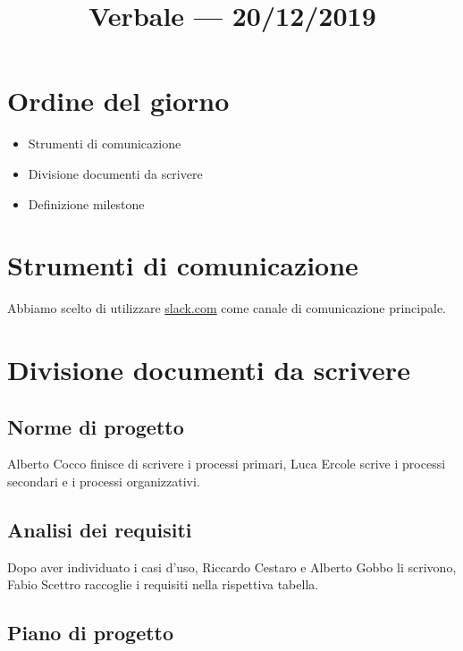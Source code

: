 \documentclass{article}
\title{Verbale --- 20/12/2019}
\begin{document}


\section{Ordine del giorno}%
\label{sec:ordine_del_giorno}

\begin{itemize}
  \item Strumenti di comunicazione
  \item Divisione documenti da scrivere
  \item Definizione milestone
\end{itemize}

\section{Strumenti di comunicazione}%
\label{sec:strumenti_di_comunicazione}

Abbiamo scelto di utilizzare \href{Slack}{slack.com} come canale di comunicazione principale.

\section{Divisione documenti da scrivere}%
\label{sec:divisione_documenti_da_scrivere}

\subsection{Norme di progetto}%
\label{sub:norme_di_progetto}

Alberto Cocco finisce di scrivere i processi primari, Luca Ercole scrive i processi secondari e i processi organizzativi.

\subsection{Analisi dei requisiti}%
\label{sub:analisi_dei_requisiti}

Dopo aver individuato i casi d'uso, Riccardo Cestaro e Alberto Gobbo li scrivono, Fabio Scettro raccoglie i requisiti nella rispettiva tabella.

\subsection{Piano di progetto}%
\label{sub:piano_di_progetto}
\end{document}
